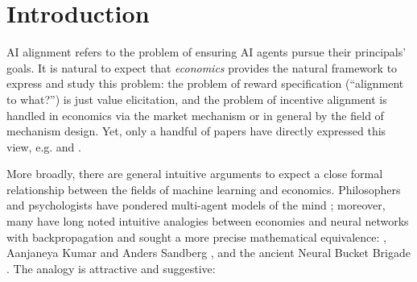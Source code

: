 \chapter{Introduction}\label{ch:intro}


AI alignment refers to the problem of ensuring AI agents pursue their principals' goals. It is natural to expect that \emph{economics} provides the natural framework to express and study this problem: the problem of reward specification (``alignment to what?'') is just value elicitation, and the problem of incentive alignment is handled in economics via the market mechanism or in general by the field of mechanism design. Yet, only a handful of papers have directly expressed this view, e.g. \citet{bergemannMechanismDesignAlignment2026} and \citet{conitzerPositionSocialChoice2024}.

More broadly, there are general intuitive arguments to expect a close formal relationship between the fields of machine learning and economics. Philosophers and psychologists have pondered multi-agent models of the mind \citep{minskySocietyMind1988}; moreover, many have long noted intuitive analogies between economies and neural networks with backpropagation and sought a more precise mathematical equivalence: \citet{wentworthCompetitiveMarketsDistributed2018}, Aanjaneya Kumar and Anders Sandberg \citep{aiobjectivesinstituteProjects}, and the ancient Neural Bucket Brigade \citep{davisMappingClassifierSystems1988, schmidhuberLocalLearningAlgorithm1989}. The analogy is attractive and suggestive:

